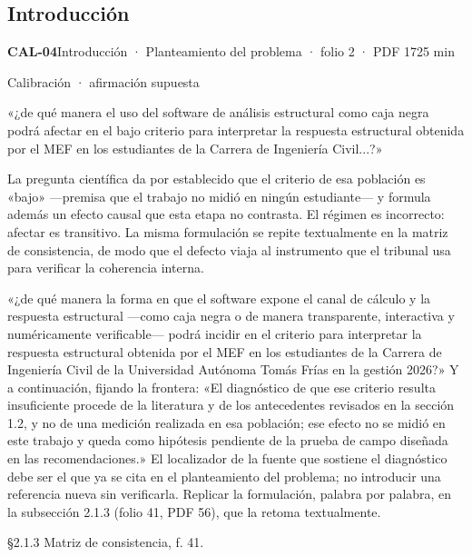\subsection{Introducción}
\noindent\casilla\textbf{CAL-04}\quad{}\quad Introducción · Planteamiento del problema · folio 2 · PDF 17\hfill 25 min\par\vspace{1pt}
{\small\color{gris}Calibración · afirmación supuesta}\par
\begin{dice}«¿de qué manera el uso del software de análisis estructural como caja negra podrá afectar en el bajo criterio para interpretar la respuesta estructural obtenida por el MEF en los estudiantes de la Carrera de Ingeniería Civil...?»\end{dice}
{\small{}La pregunta científica da por establecido que el criterio de esa población es «bajo» —premisa que el trabajo no midió en ningún estudiante— y formula además un efecto causal que esta etapa no contrasta. El régimen es incorrecto: afectar es transitivo. La misma formulación se repite textualmente en la matriz de consistencia, de modo que el defecto viaja al instrumento que el tribunal usa para verificar la coherencia interna.\par}
\begin{debedecir}«¿de qué manera la forma en que el software expone el canal de cálculo y la respuesta estructural —como caja negra o de manera transparente, interactiva y numéricamente verificable— podrá incidir en el criterio para interpretar la respuesta estructural obtenida por el MEF en los estudiantes de la Carrera de Ingeniería Civil de la Universidad Autónoma Tomás Frías en la gestión 2026?» Y a continuación, fijando la frontera: «El diagnóstico de que ese criterio resulta insuficiente procede de la literatura y de los antecedentes revisados en la sección 1.2, y no de una medición realizada en esa población; ese efecto no se midió en este trabajo y queda como hipótesis pendiente de la prueba de campo diseñada en las recomendaciones.» El localizador de la fuente que sostiene el diagnóstico debe ser el que ya se cita en el planteamiento del problema; no introducir una referencia nueva sin verificarla. Replicar la formulación, palabra por palabra, en la subsección 2.1.3 (folio 41, PDF 56), que la retoma textualmente.\end{debedecir}
{\small{}§2.1.3 Matriz de consistencia, f. 41.\par}
